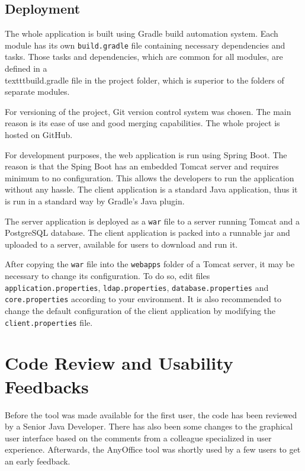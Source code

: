 \documentclass[11pt,singleside]{myfithesis2}
\begin{document}
		\subsection{Deployment}\label{deployment}
The whole application is built using Gradle build automation system. Each module has its own \texttt{build.gradle} file containing necessary dependencies and tasks. Those tasks and dependencies, which are common for all modules, are defined in a \\texttt{build.gradle} file in the project folder, which is superior to the folders of separate modules.

For versioning of the project, Git version control system was chosen. The main reason is its ease of use and good merging capabilities. The whole project is hosted on GitHub.

For development purposes, the web application is run using Spring Boot. The reason is that the Sping Boot has an embedded Tomcat server and requires minimum to no configuration. This allows the developers to run the application without any hassle. The client application is a standard Java application, thus it is run in a standard way by Gradle's Java plugin.

The server application is deployed as a \texttt{war} file to a server running Tomcat and a PostgreSQL database. The client application is packed into a runnable jar and uploaded to a server, available for users to download and run it.

After copying the \texttt{war} file into the \texttt{webapps} folder of a Tomcat server, it may be necessary to change its configuration. To do so, edit files \texttt{application.properties}, \texttt{ldap.properties}, \texttt{database.properties} and \texttt{core.properties} according to your environment. It is also recommended to change the default configuration of the client application by modifying the \texttt{client.properties} file.
	
	\section{Code Review and Usability Feedbacks}

Before the tool was made available for the first user, the code has been reviewed by a Senior Java Developer. There has also been some changes to the graphical user interface based on the comments from a colleague specialized in user experience. Afterwards, the AnyOffice tool was shortly used by a few users to get an early feedback.
\end{document}
